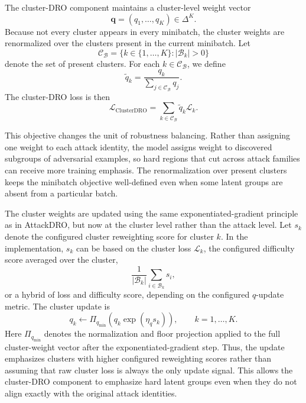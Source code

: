 The cluster-DRO component maintains a cluster-level weight vector
\begin{equation}
    \mathbf{q} = (q_1,\ldots,q_K) \in \Delta^K.
\end{equation}
Because not every cluster appears in every minibatch, the cluster weights are
renormalized over the clusters present in the current minibatch. Let
\begin{equation}
    \mathcal{C}_{\mathcal{B}}
    =
    \{k \in \{1,\ldots,K\}: |\mathcal{B}_k|>0\}
\end{equation}
denote the set of present clusters. For each \(k \in \mathcal{C}_{\mathcal{B}}\), we
define
\begin{equation}
    \tilde{q}_k
    =
    \frac{q_k}
    {\sum_{j\in\mathcal{C}_{\mathcal{B}}} q_j}.
\end{equation}
The cluster-DRO loss is then
\begin{equation}
    \mathcal{L}_{\mathrm{ClusterDRO}}
    =
    \sum_{k\in\mathcal{C}_{\mathcal{B}}}
    \tilde{q}_k \mathcal{L}_k.
    \label{eq:cluster_dro_loss}
\end{equation}

This objective changes the unit of robustness balancing. Rather than assigning one
weight to each attack identity, the model assigns weight to discovered subgroups
of adversarial examples, so hard regions that cut across attack families can receive
more training emphasis. The renormalization over present clusters keeps the minibatch
objective well-defined even when some latent groups are absent from a particular batch.

The cluster weights are updated using the same exponentiated-gradient principle as in
AttackDRO, but now at the cluster level rather than the attack level. Let \(s_k\)
denote the configured cluster reweighting score for cluster \(k\). In the
implementation, \(s_k\) can be based on the cluster loss \(\mathcal{L}_k\), the
configured difficulty score averaged over the cluster,
\begin{equation}
    \frac{1}{|\mathcal{B}_k|}
    \sum_{i\in\mathcal{B}_k} s_i,
\end{equation}
or a hybrid of loss and difficulty score, depending on the configured \(q\)-update
metric. The cluster update is
\begin{equation}
    q_k
    \leftarrow
    \Pi_{q_{\min}}
    \left(
    q_k \exp(\eta_q s_k)
    \right),
    \qquad k=1,\ldots,K.
\end{equation}
Here \(\Pi_{q_{\min}}\) denotes the normalization and floor projection applied to
the full cluster-weight vector after the exponentiated-gradient step. Thus, the
update emphasizes clusters with higher configured reweighting scores rather than
assuming that raw cluster loss is always the only update signal.
This allows the cluster-DRO component to emphasize hard latent groups even when they
do not align exactly with the original attack identities.

